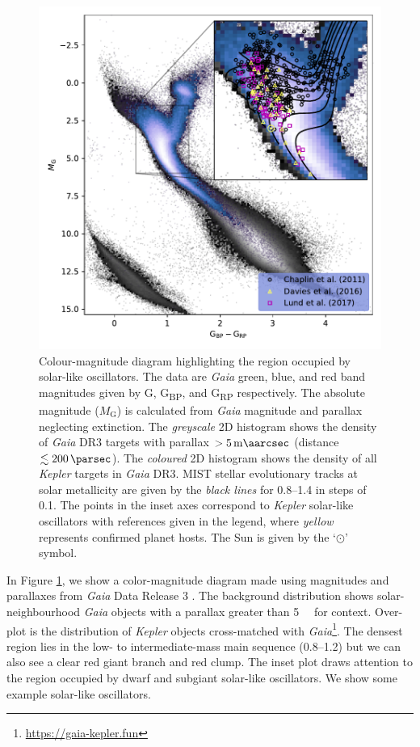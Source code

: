\begin{figure}
    \centering
    \includegraphics{figures/hr-diagram.pdf}
    \caption[Colour-magnitude diagram highlighting the region occupied by dwarf and subgiant solar-like oscillators.]{Colour-magnitude diagram highlighting the region occupied by solar-like oscillators. The data are \emph{Gaia} green, blue, and red band magnitudes given by G, G\textsubscript{BP}, and G\textsubscript{RP} respectively. The absolute magnitude (\(M_\mathrm{G}\)) is calculated from \emph{Gaia} magnitude and parallax neglecting extinction. The \emph{greyscale} 2D histogram shows the density of \emph{Gaia} DR3 targets with parallax \(>\SI{5}{\milli\aarcsec}\) (distance \(\lesssim\SI{200}{\parsec}\)). The \emph{coloured} 2D histogram shows the density of all \emph{Kepler} targets in \emph{Gaia} DR3. MIST stellar evolutionary tracks at solar metallicity are given by the \emph{black lines} for \SIrange{0.8}{1.4}{\solarmass} in steps of \SI{0.1}{\solarmass}. The points in the inset axes correspond to \emph{Kepler} solar-like oscillators with references given in the legend, where \emph{yellow} represents confirmed planet hosts. The Sun is given by the `\(\odot\)' symbol.}
    \label{fig:hr-diagram}
\end{figure}

In Figure \ref{fig:hr-diagram}, we show a color-magnitude diagram made using magnitudes and parallaxes from \emph{Gaia} Data Release 3 \citep[DR3;][]{GaiaCollaboration.Vallenari.ea2022}. The background distribution shows solar-neighbourhood \emph{Gaia} objects with a parallax greater than \SI{5}{\milli\aarcsec} for context. Over-plot is the distribution of \emph{Kepler} objects cross-matched with \emph{Gaia}\footnote{\url{https://gaia-kepler.fun}}. The densest region lies in the low- to intermediate-mass main sequence (\SIrange{0.8}{1.2}{\solarmass}) but we can also see a clear red giant branch and red clump. The inset plot draws attention to the region occupied by dwarf and subgiant solar-like oscillators. We show some example solar-like oscillators.

